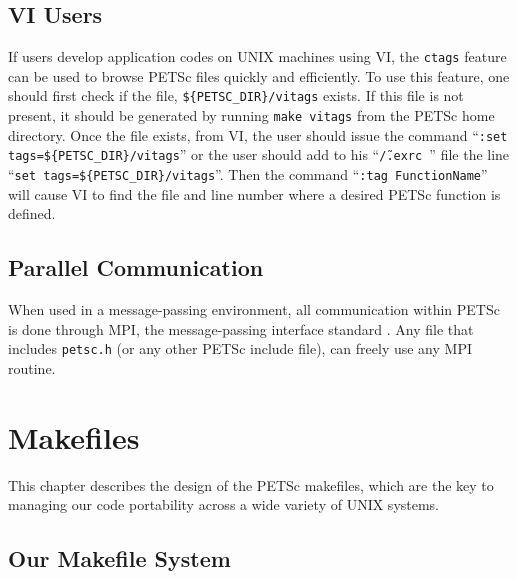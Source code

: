 \section{VI Users}  \label{sec:vi}

 
If users develop 
application codes on UNIX machines using VI, the {\tt ctags} feature 
can be used to browse PETSc files quickly and efficiently.  To use 
this feature, one should first check if the file, {\tt \$\{PETSC\_DIR\}/vitags} 
exists.  If this file is not present, it should be generated by running 
{\tt make vitags} from the PETSc home directory. Once the file exists, 
from VI, the user should issue the command ``{\tt :set tags=\$\{PETSC\_DIR\}/vitags}'' 
or the user should add to
his ``{\tt \~/.exrc }'' file the line ``{\tt set tags=\$\{PETSC\_DIR\}/vitags}''.
Then the command ``{\tt :tag FunctionName}'' will cause VI 
to find the file and line number where a desired PETSc function 
is defined. 

\section{Parallel Communication}

When used in a message-passing environment, all communication 
within
PETSc is done through MPI, the message-passing interface standard
\cite{MPI-final}.  Any file that includes {\tt petsc.h} (or any other 
PETSc include file), can freely use any MPI routine.

\chapter{Makefiles}
\label{ch:makefiles}

This chapter describes the design of the PETSc makefiles, which are the
key to managing our code portability across a wide variety of UNIX systems.

\section{Our Makefile System}

